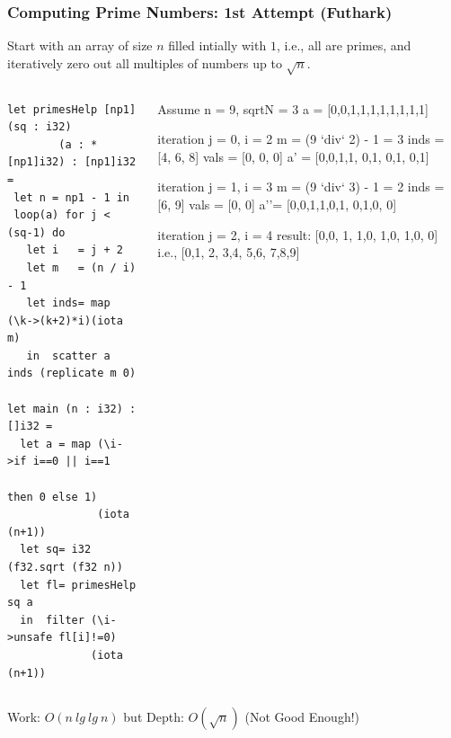 \documentclass{beamer}
\renewcommand{\emph}[1]{\textcolor{structure}{#1}}
\newcommand{\emp}[1]{\textcolor{DikuRed}{ #1}}
\newcommand{\mymath}[1]{$ #1 $}
\begin{document}
\begin{frame}[fragile,t]
  \frametitle{Computing Prime Numbers: 1st Attempt (Futhark)}

Start with an array of size $n$ filled intially with $1$,
i.e., all are primes, and iteratively zero out all multiples
of numbers up to $\sqrt{n}$.

\begin{columns}

\lstset{basicstyle=\scriptsize}
  \begin{lstlisting}
let primesHelp [np1] (sq : i32) 
        (a : *[np1]i32) : [np1]i32 =
 let n = np1 - 1 in
 loop(a) for j < (sq-1) do 
   let i   = j + 2
   let m   = (n / i) - 1
   let inds= map (\k->(k+2)*i)(iota m)
   in  scatter a inds (replicate m 0)

let main (n : i32) : []i32 = 
  let a = map (\i->if i==0 || i==1
                   then 0 else 1) 
              (iota (n+1))
  let sq= i32 (f32.sqrt (f32 n))
  let fl= primesHelp sq a
  in  filter (\i->unsafe fl[i]!=0) 
             (iota (n+1))
  \end{lstlisting}
\lstset{basicstyle=\small}
%
\vspace{-2ex}
\begin{colorcode}[fontsize=\scriptsize]
Assume n = 9, sqrtN = 3 
a = [0,0,1,1,1,1,1,1,1,1]

iteration j = 0, i = 2
m    = (9 `div` 2) - 1 = 3
inds = [4, 6, 8]
vals = [0, 0, 0]
a' = [0,0,1,1,\emp{0},1,\emp{0},1,\emp{0},1]

iteration j = 1, i = 3
m    = (9 `div` 3) - 1 = 2
inds = [6, 9]
vals = [0, 0]
a''= [0,0,1,1,0,1,\emp{0},1,0,\emp{0}]

iteration j = 2, i = 4
result: [0,0,\emp{1},\emp{1},0,\emp{1},0,\emp{1},0,\emp{0}]
  i.e., [0,1,\emp{2},\emp{3},4,\emp{5},6,\emp{7},8,9]
\end{colorcode}
\end{columns}
\medskip

\emph{Work: $O(n \ lg \ lg \ n)$} but \emp{Depth: $O(\sqrt{n})$ (Not Good Enough!)}

\end{frame}
\end{document}
